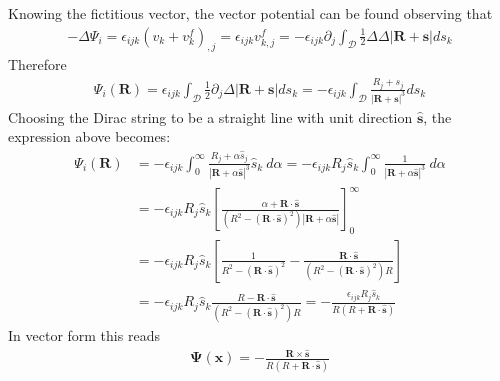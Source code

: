 Knowing the fictitious vector, the vector potential can be found observing that  
\begin{align}
-\Delta \Psi_i=\epsilon_{ijk}(v_k+v^f_k)_{,j}=\epsilon_{ijk}v^f_{k,j}=-\epsilon_{ijk}\partial_j\int_\mathcal{D}\frac{1}{2}\Delta\Delta |\mathbf{R}+\mathbf{s}|ds_k
\end{align}
Therefore
\begin{align}
\Psi_i(\mathbf R)=\epsilon_{ijk}\int_\mathcal{D}\frac{1}{2}\partial_j\Delta |\mathbf{R}+\mathbf{s}|ds_k=-\epsilon_{ijk}\int_\mathcal{D}\frac{R_j+s_j}{|\mathbf{R}+\mathbf{s}|^3}ds_k
\end{align}
Choosing the Dirac string to be a straight line with unit direction $\hat{\mathbf{s}}$, the expression above becomes:
\begin{align}
\Psi_i(\mathbf R)&
=-\epsilon_{ijk}\int_0^\infty\frac{R_j+\alpha \hat{s}_j}{|\mathbf{R}+\alpha\hat{\mathbf{s}}|^3}\hat{s}_k\ d\alpha
=-\epsilon_{ijk}R_j\hat{s}_k\int_0^\infty\frac{1}{|\mathbf{R}+\alpha\hat{\mathbf{s}}|^3}\ d\alpha\nonumber\\
&=-\epsilon_{ijk}R_j\hat{s}_k\left[\frac{\alpha+\mathbf{R}\cdot\hat{\mathbf{s}}}{\left(R^2-(\mathbf{R}\cdot\hat{\mathbf{s}})^2\right)|\mathbf R+\alpha\hat{\mathbf s}|}\right]_0^\infty\nonumber\\
&=-\epsilon_{ijk}R_j\hat{s}_k\left[\frac{1}{R^2-(\mathbf{R}\cdot\hat{\mathbf{s}})^2}
-\frac{\mathbf{R}\cdot\hat{\mathbf{s}}}{\left(R^2-(\mathbf{R}\cdot\hat{\mathbf{s}})^2\right)R}\right]\nonumber\\
&=-\epsilon_{ijk}R_j\hat{s}_k
\frac{R-\mathbf{R}\cdot\hat{\mathbf{s}}}{\left(R^2-(\mathbf{R}\cdot\hat{\mathbf{s}})^2\right)R}
=-\frac{\epsilon_{ijk}R_j\hat{s}_k}{R\left(R+\mathbf{R}\cdot\hat{\mathbf{s}}\right)}
\end{align}
In vector form this reads
\begin{align}
\mathbf{\Psi}(\mathbf{x})=-\frac{\mathbf{R}\times\hat{\mathbf{s}}}{R\left(R+\mathbf{R}\cdot\hat{\mathbf{s}}\right)}
\end{align}

